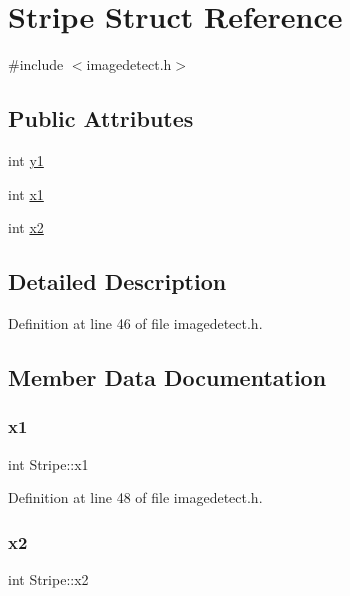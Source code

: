 \hypertarget{struct_stripe}{}\section{Stripe Struct Reference}
\label{struct_stripe}


{\ttfamily \#include $<$imagedetect.\+h$>$}

\subsection*{Public Attributes}
\begin{DoxyCompactItemize}
\item 
int \mbox{\hyperlink{struct_stripe_a91e57d4e64493c1ff6c90944bf9e09e8}{y1}}
\item 
int \mbox{\hyperlink{struct_stripe_a24e42bbe0a33d7c644c13101b8bf4d2f}{x1}}
\item 
int \mbox{\hyperlink{struct_stripe_ad8375e72857ae244a1ab423034a21be9}{x2}}
\end{DoxyCompactItemize}


\subsection{Detailed Description}


Definition at line 46 of file imagedetect.\+h.



\subsection{Member Data Documentation}
\mbox{\label{struct_stripe_a24e42bbe0a33d7c644c13101b8bf4d2f}} 
\subsubsection{\texorpdfstring{x1}{x1}}
{\footnotesize\ttfamily int Stripe\+::x1}



Definition at line 48 of file imagedetect.\+h.

\mbox{\label{struct_stripe_ad8375e72857ae244a1ab423034a21be9}} 
\subsubsection{\texorpdfstring{x2}{x2}}
{\footnotesize\ttfamily int Stripe\+::x2}



